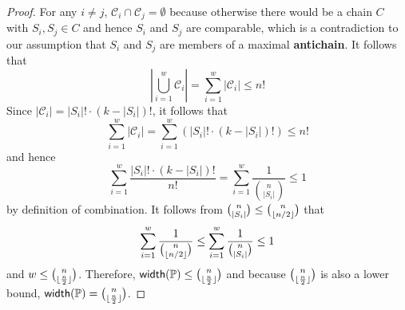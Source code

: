 \begin{proof}
    For any $i \neq j$, $\mathcal{C}_i \cap \mathcal{C}_j = \emptyset$ because otherwise there would be a chain $C$ with $S_i,S_j \in C$ and hence $S_i$ and $S_j$ are comparable, which is a contradiction to our assumption that $S_i$ and $S_j$ are members of a maximal \textbf{antichain}. It follows that
    $$
    \left| \bigcup_{i=1}^w \mathcal{C}_i \right| = \sum_{i=1}^w |\mathcal{C}_i| \leq n!
    $$
    Since $|\mathcal{C}_i| = |S_i|! \cdot (k-|S_i|)!$, it follows that
    $$
    \sum_{i=1}^w |\mathcal{C}_i| = \sum_{i=1}^w (|S_i|! \cdot (k-|S_i|)!) \leq n!
    $$
    and hence
    $$
    \sum_{i=1}^w \frac{|S_i|! \cdot (k-|S_i|)!}{n!} = \sum_{i=1}^w \frac{1}{\binom{n}{|S_i|}} \leq 1
    $$
    by definition of combination. It follows from $\binom{n}{|S_i|} \leq \binom{n}{\lfloor n/2\rfloor}$ that
    $$
    \sum_{i=1}^w \frac{1}{\binom{n}{\lfloor n/2\rfloor}} \leq \sum_{i=1}^w \frac{1}{\binom{n}{|S_i|}}\leq 1
    $$
    and $w \leq \binom{n}{\lfloor\frac{n}{2}\rfloor}$. Therefore, $\mathsf{width}(\mathbb{P}) \leq \binom{n}{\lfloor\frac{n}{2}\rfloor}$ and because $\binom{n}{\lfloor\frac{n}{2}\rfloor}$ is also a lower bound, $\mathsf{width}(\mathbb{P}) = \binom{n}{\lfloor\frac{n}{2}\rfloor}$.
\end{proof}